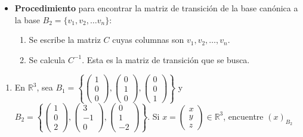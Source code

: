 \begin{itemize}
\item
\textbf{Procedimiento} para encontrar la matriz de transición de la base canónica a la base $B_2 = \{ v_1,v_2, \dots v_n \}$:

\begin{enumerate}
\item
Se escribe la matriz $C$ cuyas columnas son $v_1,v_2, \dots, v_n$.

\item
Se calcula $C^{-1}$. Esta es la matriz de transición que se busca.
\end{enumerate}
\end{itemize}





\begin{ejem}
\begin{enumerate}
\item
En $\mathbb{R}^3$, sea $B_1 = \left\{ \begin{pmatrix} 1\\ 0 \\ 0  \end{pmatrix} ,\begin{pmatrix} 0 \\ 1 \\ 0  \end{pmatrix}, \begin{pmatrix} 0\\ 0 \\ 1  \end{pmatrix} \right\}$ y $B_2 = \left\{ \begin{pmatrix} 1\\ 0 \\ 2  \end{pmatrix} ,\begin{pmatrix} 3 \\ -1 \\ 0  \end{pmatrix}, \begin{pmatrix} 0\\ 1 \\ -2  \end{pmatrix} \right\}$. Si $x = \begin{pmatrix} x \\ y \\ z \end{pmatrix} \in \mathbb{R}^3$, encuentre $(x)_{B_2}$
\\\


\end{enumerate}
\end{ejem}
